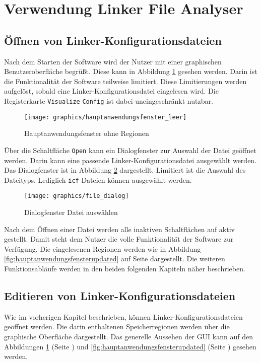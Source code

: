 \section{Verwendung Linker File Analyser}\label{kap:verwendung_lfa}
\subsection{Öffnen von Linker-Konfigurationsdateien}
Nach dem Starten der Software wird der Nutzer mit einer graphischen Benutzeroberfläche begrüßt.
Diese kann in Abbildung \ref{fig:hauptanwendungsfensterleer} gesehen werden.
Darin ist die Funktionalität der Software teilweise limitiert.
Diese Limitierungen werden aufgelöst, sobald eine Linker-Konfigurationsdatei eingelesen wird. 
Die Registerkarte \verb*|Visualize| \verb*|Config| ist dabei uneingeschränkt nutzbar. \\
\begin{figure}[H]
	\centering
	\texttt{[image: graphics/hauptanwendungsfenster\_leer]}
	\caption{Hauptanwendungsfenster ohne Regionen}
	\label{fig:hauptanwendungsfensterleer}
\end{figure}

Über die Schaltfläche \verb*|Open| kann ein Dialogfenster zur Auswahl der Datei geöffnet werden.
Darin kann eine passende Linker-Konfigurationsdatei ausgewählt werden.
Das Dialogfenster ist in Abbildung \ref{fig:filedialog} dargestellt.
Limitiert ist die Auswahl des Dateityps.
Lediglich \verb*|icf|-Dateien können ausgewählt werden. \\

\begin{figure}[H]
	\centering
	\texttt{[image: graphics/file\_dialog]}
	\caption{Dialogfenster Datei auswählen}
	\label{fig:filedialog}
\end{figure}

Nach dem Öffnen einer Datei werden alle inaktiven Schaltflächen auf aktiv gestellt.
Damit steht dem Nutzer die volle Funktionalität der Software zur Verfügung.
Die eingelesenen Regionen werden wie in Abbildung \ref{fig:hauptanwendungsfensterupdated} auf Seite \pageref{fig:hauptanwendungsfensterupdated} dargestellt.
Die weiteren Funktionsabläufe werden in den beiden folgenden Kapiteln näher beschrieben.

\subsection{Editieren von Linker-Konfigurationsdateien}
Wie im vorherigen Kapitel beschrieben, können Linker-Konfigurationsdateien geöffnet werden.
Die darin enthaltenen Speicherregionen werden über die graphische Oberfläche dargestellt.
Das generelle Aussehen der GUI kann auf den Abbildungen \ref{fig:hauptanwendungsfensterleer} (Seite \pageref{fig:hauptanwendungsfensterleer}) und \ref{fig:hauptanwendungsfensterupdated} (Seite \pageref{fig:hauptanwendungsfensterupdated}) gesehen werden.\\

